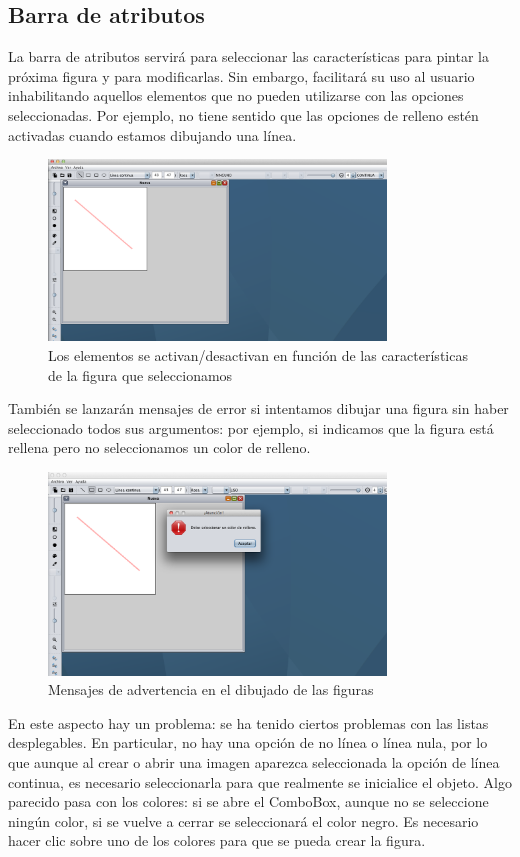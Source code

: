\subsection{Barra de atributos}
La barra de atributos servirá para seleccionar las características para pintar la próxima figura y para modificarlas. Sin embargo, facilitará su uso al usuario inhabilitando aquellos elementos que no pueden utilizarse con las opciones seleccionadas.
\vskip0.3cm
Por ejemplo, no tiene sentido que las opciones de relleno estén activadas cuando estamos dibujando una línea.
\begin{figure}[H]
 \centering
  \includegraphics[width=0.8\textwidth]{graficos/coherencia1.jpg}
 \caption{Los elementos se activan/desactivan en función de las características de la figura que seleccionamos}
 \label{diseño}
 \end{figure}
 También se lanzarán mensajes de error si intentamos dibujar una figura sin haber seleccionado todos sus argumentos: por ejemplo, si indicamos que la figura está rellena pero no seleccionamos un color de relleno.
 \begin{figure}[H]
 \centering
  \includegraphics[width=0.8\textwidth]{graficos/coherencia2.jpg}
 \caption{Mensajes de advertencia en el dibujado de las figuras}
 \label{diseño}
 \end{figure}
En este aspecto hay un problema: se ha tenido ciertos problemas con las listas desplegables. En particular, no hay una opción de no línea o línea nula, por lo que aunque al crear o abrir una imagen aparezca seleccionada la opción de línea continua, es necesario seleccionarla para que realmente se inicialice el objeto.\vskip0.3cm
 Algo parecido pasa con los colores: si se abre el ComboBox, aunque no se seleccione ningún color, si se vuelve a cerrar se seleccionará el color negro. Es necesario hacer clic sobre uno de los colores para que se pueda crear la figura.
